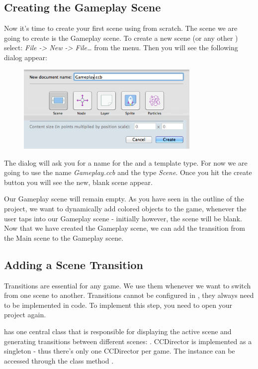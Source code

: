 \subsection{Creating the Gameplay Scene}
Now it's time to create your first scene using \SB{} from scratch. The scene we
are going to create is the Gameplay scene. To create a new scene (or any
other \ccbfile{}) select: \textit{File -> New -> File\ldots} from the \SB{} menu.
Then you will see the following dialog appear:

\begin{figure}[H]
		\centering
		\includegraphics[width=250pt]{images/firstproject/new_scene.png}
\end{figure}

The dialog will ask you for a name for the \ccbfile{} and a template type. For
now we are going to use the name \textit{Gameplay.ccb} and the type
\textit{Scene}. Once you hit the create button you will see the new, blank
scene appear.

Our Gameplay scene will remain empty. As you have seen in the outline
of the project, we want to dynamically add colored objects to the game, whenever
the user taps into our Gameplay scene - initially however, the scene will be
blank. Now that we have created the Gameplay scene, we can add the transition
from the Main scene to the Gameplay scene.

\subsection{Adding a Scene Transition}
Transitions  are essential for any game. We use them
whenever we want to switch from one scene to another. Transitions cannot be configured in
\SB{}, they always need to be implemented in code. To implement this step,
you need to open your \xcode{} project again.

\cocos{} has one central class that is responsible for displaying the active
scene and generating transitions between different scenes:
. CCDirector is implemented as a
singleton - thus there's only one CCDirector per \cocos{} game. The instance can be accessed
through the class method .


